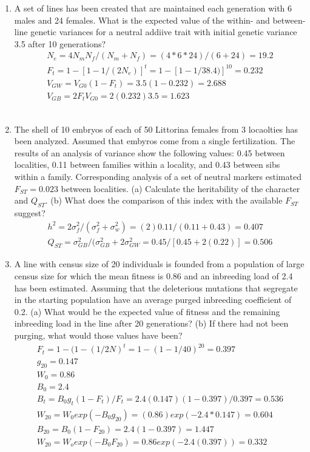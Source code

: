 \documentclass[12pt]{amsart}
\begin{document}
\begin{enumerate}
\item A set of lines has been created that are maintained each generation with 6 males and 24 females. What is the expected value of the within- and between-line genetic variances for a neutral addiive trait with initial genetic variance 3.5 after 10 generations?\\
\begin{gather*}
N_e = 4N_mN_f/(N_m+N_f) = (4*6*24)/(6+24) = 19.2\\
F_t =1-[1-1/(2N_e)]^t = 1-[1-1/38.4)]^10 = 0.232\\
V_{GW} = V_{G0}(1-F_t) = 3.5(1-0.232) = 2.688\\
V_{GB} = 2F_tV_{G0} = 2(0.232)3.5 = 1.623
\end{gather*}
\\
\item The shell of 10 embryos of each of 50 Littorina females from 3 locaolties has been analyzed. Assumed that embyros come from a single fertilization. The results of an analysis of variance show the following values: 0.45 between localities, 0.11 between families within a locality, and 0.43 between sibs within a family. Corresponding analysis of a set of neutral markers estimated $F_{ST} = 0.023$ between localities. (a) Calculate the heritability of the character and $Q_{ST}$. (b) What does the comparison of this index with the available $F_{ST}$ suggest?\\
\begin{gather*}
h^2 = 2\sigma_f^2/(\sigma_f^2 + \sigma_w^2) = (2)0.11/(0.11+0.43) = 0.407\\
Q_{ST} = \sigma_{GB}^2/(\sigma_{GB}^2 + 2\sigma_{GW}^2 = 0.45/[0.45 + 2(0.22)] = 0.506
\end{gather*}

\item A line with census size of 20 individuals is founded from a population of large census size for which the mean fitness is 0.86 and an inbreeding load of 2.4 has been estimated. Assuming that the deleterious mutations that segregate in the starting population have an average purged inbreeding coefficient of 0.2. (a) What would be the expected value of fitness and the remaining inbreeding load in the line after 20 generations? (b) If there had not been purging, what would those values have been?\\
\begin{gather*}
F_t = 1-(1-(1/2N)^t = 1-(1-1/40)^20 = 0.397\\
g_{20} = 0.147\\
W_0 = 0.86\\
B_0 = 2.4\\
B_t = B_0g_t(1-F_t)/F_t = 2.4(0.147)(1-0.397)/0.397 = 0.536\\
W_20 = W_0exp(-B_0g_{20}) = (0.86)exp(-2.4*0.147) = 0.604\\
B_{20} = B_0(1-F_{20}) = 2.4(1-0.397) = 1.447 \\
W_{20} = W_oexp(-B_0F_{20}) = 0.86 exp(-2.4(0.397)) = 0.332
\end{gather*}
\end{enumerate}
\end{document}

